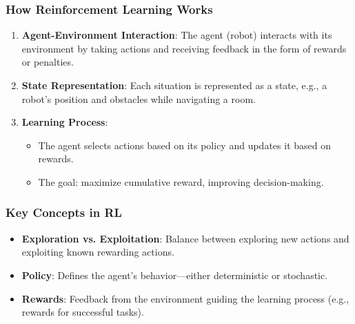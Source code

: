 \documentclass{beamer}
\begin{document}
\begin{frame}[fragile]
    \frametitle{How Reinforcement Learning Works}
    \begin{enumerate}
        \item \textbf{Agent-Environment Interaction}: The agent (robot) interacts with its environment by taking actions and receiving feedback in the form of rewards or penalties.
        
        \item \textbf{State Representation}: Each situation is represented as a state, e.g., a robot's position and obstacles while navigating a room.
        
        \item \textbf{Learning Process}:
        \begin{itemize}
            \item The agent selects actions based on its policy and updates it based on rewards.
            \item The goal: maximize cumulative reward, improving decision-making.
        \end{itemize}
    \end{enumerate}
\end{frame}

\begin{frame}[fragile]
    \frametitle{Key Concepts in RL}
    \begin{itemize}
        \item \textbf{Exploration vs. Exploitation}: Balance between exploring new actions and exploiting known rewarding actions.
        
        \item \textbf{Policy}: Defines the agent's behavior—either deterministic or stochastic.
        
        \item \textbf{Rewards}: Feedback from the environment guiding the learning process (e.g., rewards for successful tasks).
    \end{itemize}
\end{frame}
\end{document}
